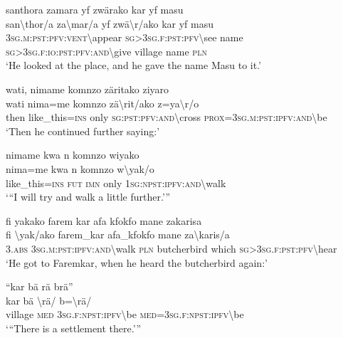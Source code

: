 \ea\label{ex:2:a1629}
santhora zamara yf zwärako kar yf masu\\
\gll san{\textbackslash}thor/a	za{\textbackslash}mar/a	yf	zwä{\textbackslash}r/ako	kar	yf	masu\\
     3\textsc{sg}.\textsc{m}:\textsc{pst}:\textsc{pfv}:\textsc{vent}{\textbackslash}appear	\textsc{sg}>3\textsc{sg}.\textsc{f}:\textsc{pst}:\textsc{pfv}{\textbackslash}see	name	\textsc{sg}>3\textsc{sg}.\textsc{f}:\textsc{io}:\textsc{pst}:\textsc{pfv}:\textsc{and}{\textbackslash}give	village	name	\textsc{pln}\\
\glt `He looked at the place, and he gave the name Masu to it.'
\z

\ea\label{ex:2:a1630}
wati, nimame komnzo zäritako ziyaro\\
\gll wati	nima=me	komnzo	zä{\textbackslash}rit/ako	z=ya{\textbackslash}r/o\\
     then	like\_this=\textsc{ins}	only	\textsc{sg}:\textsc{pst}:\textsc{pfv}:\textsc{and}{\textbackslash}cross	\textsc{prox}=3\textsc{sg}.\textsc{m}:\textsc{pst}:\textsc{ipfv}:\textsc{and}{\textbackslash}be\\
\glt `Then he continued further saying:'
\z

\ea\label{ex:2:a1631}
nimame kwa n komnzo wiyako\\
\gll nima=me	kwa	n	komnzo	w{\textbackslash}yak/o\\
     like\_this=\textsc{ins}	\textsc{fut}	\textsc{imn}	only	1\textsc{sg}:\textsc{npst}:\textsc{ipfv}:\textsc{and}{\textbackslash}walk\\
\glt `{``}I will try and walk a little further.'''
\z

\newpage
\ea\label{ex:2:a1632}
fi yakako farem kar afa kfokfo mane zakarisa\\
\gll fi	{\textbackslash}yak/ako	farem\_kar	afa\_kfokfo	mane	za{\textbackslash}karis/a\\
     3.\textsc{abs}	3\textsc{sg}.\textsc{m}:\textsc{pst}:\textsc{ipfv}:\textsc{and}{\textbackslash}walk	\textsc{pln}	butcherbird	which	\textsc{sg}>3\textsc{sg}.\textsc{f}:\textsc{pst}:\textsc{pfv}{\textbackslash}hear\\
\glt `He got to Faremkar, when he heard the butcherbird again:'
\z

\ea\label{ex:2:a1634}
``kar bä rä brä''\\
\gll kar	bä	{\textbackslash}rä/	b={\textbackslash}rä/\\
     village	\textsc{med}	3\textsc{sg}.\textsc{f}:\textsc{npst}:\textsc{ipfv}{\textbackslash}be	\textsc{med}=3\textsc{sg}.\textsc{f}:\textsc{npst}:\textsc{ipfv}{\textbackslash}be\\
\glt `{``}There is a settlement there.'''
\z

